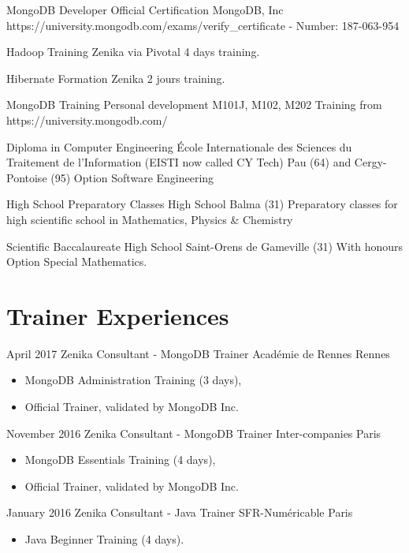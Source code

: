 \documentclass[11pt,a4paper,sans]{moderncv}
\begin{document}
{MongoDB Developer Official Certification}
{MongoDB, Inc}
{}
{}
{https://university.mongodb.com/exams/verify\_certificate - Number: 187-063-954}

{Hadoop Training}
{Zenika via Pivotal}
{}
{}
{4 days training.}

{Hibernate Formation}
{Zenika}
{}
{}
{2 jours training.}

{MongoDB Training}
{Personal development}
{}
{}
{M101J, M102, M202 Training from https://university.mongodb.com/}

{Diploma in Computer Engineering}
{\'Ecole Internationale des Sciences du Traitement de l’Information (EISTI now called CY Tech)}
{Pau (64) and Cergy-Pontoise (95)}
{}
{Option Software Engineering}

{High School Preparatory Classes}
{High School}
{Balma (31)}
{}
{Preparatory classes for high scientific school in Mathematics, Physics \& Chemistry}

{Scientific Baccalaureate}
{High School}
{Saint-Orens de Gameville (31)}
{With honours}
{Option Special Mathematics.}

\section{Trainer Experiences}\label{sec:trainer-experiences}

\cventry
{April 2017}
{Zenika Consultant - MongoDB Trainer}
{Académie de Rennes}
{Rennes}
{}
{\begin{itemize}
     \item MongoDB Administration Training (3 days),
     \item Official Trainer, validated by MongoDB Inc.
\end{itemize}
}   %

\cventry
{November 2016}
{Zenika Consultant - MongoDB Trainer}
{Inter-companies}
{Paris}
{}
{\begin{itemize}
     \item MongoDB Essentials Training (4 days),
     \item Official Trainer, validated by MongoDB Inc.
\end{itemize}
}   %

\cventry
{January 2016}
{Zenika Consultant - Java Trainer}
{SFR-Numéricable}
{Paris}
{}
{\begin{itemize}
     \item Java Beginner Training (4 days).
\end{itemize}
}   %
\end{document}
